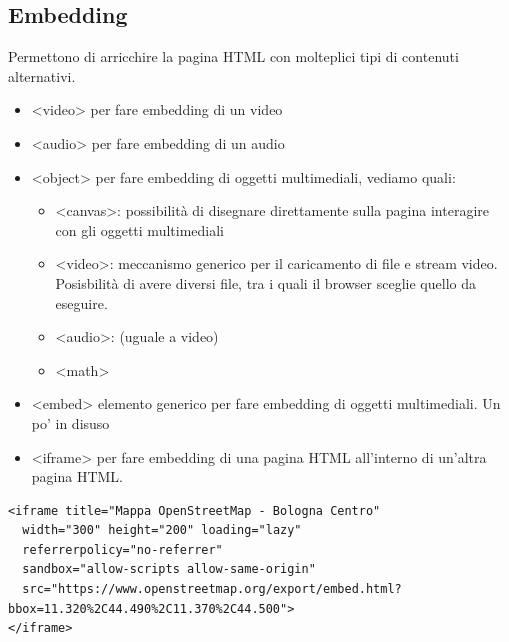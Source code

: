 \documentclass[a4paper,12pt]{article}
\begin{document}
\subsection*{Embedding}
Permettono di arricchire la pagina HTML con molteplici tipi di contenuti alternativi.
\begin{itemize}
  \item <video> per fare embedding di un video
  \item <audio> per fare embedding di un audio
  \item <object> per fare embedding di oggetti multimediali, vediamo quali:
  \begin{itemize}
    \item <canvas>: possibilità di disegnare direttamente sulla pagina interagire con gli oggetti multimediali
    \item <video>: meccanismo generico per il caricamento di file e stream video. Posisbilità di avere diversi file, tra i quali il browser sceglie quello da eseguire.
    \item <audio>: (uguale a video)
    \item <math>
  \end{itemize}
  \item <embed> elemento generico per fare embedding di oggetti multimediali. Un po' in disuso
  \item <iframe> per fare embedding di una pagina HTML all'interno di un'altra pagina HTML.
\end{itemize}
\begin{lstlisting}
<iframe title="Mappa OpenStreetMap - Bologna Centro"
  width="300" height="200" loading="lazy"
  referrerpolicy="no-referrer"
  sandbox="allow-scripts allow-same-origin"
  src="https://www.openstreetmap.org/export/embed.html?bbox=11.320%2C44.490%2C11.370%2C44.500">
</iframe>
\end{lstlisting}
\end{document}
